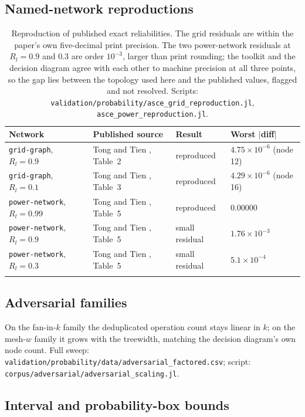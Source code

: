 \documentclass[12pt]{report}
\providecommand{\filepath}[1]{\nolinkurl{#1}}
\begin{document}
\subsection{Named-network reproductions}

{\footnotesize
\begin{longtable}{@{}p{3.0cm} p{3.6cm} l l@{}}
\toprule
Network & Published source & Result & Worst $|$diff$|$ \\
\midrule
\endhead
\texttt{grid-graph}, $R_l = 0.9$   & Tong and Tien \cite{tong2019directed}, Table~2 & reproduced & $4.75\times10^{-6}$ (node 12) \\
\texttt{grid-graph}, $R_l = 0.1$   & Tong and Tien \cite{tong2019directed}, Table~3 & reproduced & $4.29\times10^{-6}$ (node 16) \\
\texttt{power-network}, $R_l = 0.99$ & Tong and Tien \cite{tong2019directed}, Table~5 & reproduced & $0.00000$ \\
\texttt{power-network}, $R_l = 0.9$  & Tong and Tien \cite{tong2019directed}, Table~5 & small residual & $1.76\times10^{-3}$ \\
\texttt{power-network}, $R_l = 0.3$  & Tong and Tien \cite{tong2019directed}, Table~5 & small residual & $5.1\times10^{-4}$ \\
\bottomrule
\caption{Reproduction of published exact reliabilities. The grid residuals are within the
paper's own five-decimal print precision. The two power-network residuals at $R_l = 0.9$
and $0.3$ are order $10^{-3}$, larger than print rounding; the toolkit and the decision
diagram agree with each other to machine precision at all three points, so the gap lies between the
topology used here and the published values, flagged and not resolved. Scripts:
\filepath{validation/probability/asce\_grid\_reproduction.jl},
\filepath{asce_power_reproduction.jl}.}
\label{tab:appB-prob-repro}
\end{longtable}}

\subsection{Adversarial families}

On the fan-in-$k$ family the deduplicated operation count stays linear in $k$; on the
mesh-$w$ family it grows with the treewidth, matching the decision diagram's own node
count. Full sweep: \filepath{validation/probability/data/adversarial\_factored.csv}; script:
\filepath{corpus/adversarial/adversarial\_scaling.jl}.

\subsection{Interval and probability-box bounds}
\end{document}
